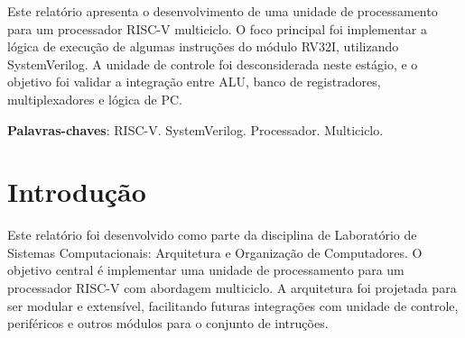 \documentclass[
	12pt,				%
	openright,			%
	a4paper,			%
	english,			%
	french,				%
	spanish,			%
	brazil,				%
	]{abntex2}
\begin{document}

\frenchspacing 


\imprimircapa

\imprimirfolhaderosto*

\setlength{\absparsep}{18pt} %
\begin{resumo}
 Este relatório apresenta o desenvolvimento de uma unidade de processamento
 para um processador RISC-V multiciclo.
 O foco principal foi implementar a lógica de execução de algumas instruções do módulo RV32I, utilizando SystemVerilog. 
 A unidade de controle foi desconsiderada neste estágio, 
 e o objetivo foi validar a integração entre ALU, banco de registradores, multiplexadores e lógica de PC. 

 \noindent
 \textbf{Palavras-chaves}: RISC-V. SystemVerilog. Processador. Multiciclo.
\end{resumo}

\listoffigures*
\clearpage

\listoftables*
\clearpage

\tableofcontents*


\textual

\chapter{Introdução}
Este relatório foi desenvolvido como parte da disciplina de 
Laboratório de Sistemas Computacionais: Arquitetura e Organização de Computadores.
O objetivo central é implementar uma unidade de processamento para um processador RISC-V 
com abordagem multiciclo. A arquitetura foi projetada para ser modular e extensível, 
facilitando futuras integrações com unidade de controle, periféricos e outros módulos para o conjunto de intruções.
\end{document}

